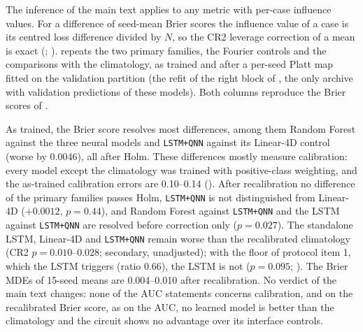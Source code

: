 \documentclass[11pt,a4paper]{article}
\begin{document}
The inference of the main text applies to any metric with per-case influence values. For a difference of seed-mean Brier scores the influence value of a case is its centred loss difference divided by $N$, so the CR2 leverage correction of a mean is exact (; ).  repeats the two primary families, the Fourier controls and the comparisons with the climatology, as trained and after a per-seed Platt map fitted on the validation partition (the refit of the right block of , the only archive with validation predictions of these models). Both columns reproduce the Brier scores of .

As trained, the Brier score resolves most differences, among them Random Forest against the three neural models and \texttt{LSTM+QNN} against its Linear-4D control (worse by 0.0046), all after Holm. These differences mostly measure calibration: every model except the climatology was trained with positive-class weighting, and the as-trained calibration errors are 0.10--0.14 (). After recalibration no difference of the primary families passes Holm, \texttt{LSTM+QNN} is not distinguished from Linear-4D ($+0.0012$, $p=0.44$), and Random Forest against \texttt{LSTM+QNN} and the LSTM against \texttt{LSTM+QNN} are resolved before correction only ($p=0.027$). The standalone LSTM, Linear-4D and \texttt{LSTM+QNN} remain worse than the recalibrated climatology (CR2 $p=0.010$--0.028; secondary, unadjusted); with the floor of protocol item 1, which the LSTM triggers (ratio 0.66), the LSTM is not ($p=0.095$; ). The Brier MDEs of 15-seed means are 0.004--0.010 after recalibration. No verdict of the main text changes: none of the AUC statements concerns calibration, and on the recalibrated Brier score, as on the AUC, no learned model is better than the climatology and the circuit shows no advantage over its interface controls.
\end{document}
